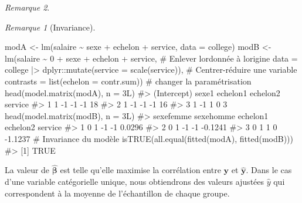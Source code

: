 \documentclass[
  11pt,
  letterpaper,
]{scrbook}
\newenvironment{Shaded}{\begin{snugshade}}{\end{snugshade}}
\newcommand{\AttributeTok}[1]{\textcolor[rgb]{0.40,0.45,0.13}{#1}}
\newcommand{\CommentTok}[1]{\textcolor[rgb]{0.37,0.37,0.37}{#1}}
\newcommand{\DecValTok}[1]{\textcolor[rgb]{0.68,0.00,0.00}{#1}}
\newcommand{\FunctionTok}[1]{\textcolor[rgb]{0.28,0.35,0.67}{#1}}
\newcommand{\NormalTok}[1]{\textcolor[rgb]{0.00,0.23,0.31}{#1}}
\newcommand{\OtherTok}[1]{\textcolor[rgb]{0.00,0.23,0.31}{#1}}
\newcommand{\SpecialCharTok}[1]{\textcolor[rgb]{0.37,0.37,0.37}{#1}}
\theoremstyle{plain}
\theoremstyle{plain}
\theoremstyle{definition}
\theoremstyle{definition}
\theoremstyle{remark}
\newtheorem{refremark}{Remarque}[chapter]
\begin{document}
\begin{refremark}
\begin{refremark}[Invariance]
\begin{Shaded}
\begin{Highlighting}[]
\NormalTok{modA }\OtherTok{\textless{}{-}} \FunctionTok{lm}\NormalTok{(salaire }\SpecialCharTok{\textasciitilde{}}\NormalTok{ sexe }\SpecialCharTok{+}\NormalTok{ echelon }\SpecialCharTok{+}\NormalTok{ service, }\AttributeTok{data =}\NormalTok{ college)}
\NormalTok{modB }\OtherTok{\textless{}{-}} \FunctionTok{lm}\NormalTok{(salaire }\SpecialCharTok{\textasciitilde{}} \DecValTok{0} \SpecialCharTok{+}\NormalTok{ sexe }\SpecialCharTok{+}\NormalTok{ echelon }\SpecialCharTok{+}\NormalTok{ service, }\CommentTok{\# Enlever l\textquotesingle{}ordonnée à l\textquotesingle{}origine}
           \AttributeTok{data =}\NormalTok{ college }\SpecialCharTok{|\textgreater{}} 
\NormalTok{            dplyr}\SpecialCharTok{::}\FunctionTok{mutate}\NormalTok{(}\AttributeTok{service =} \FunctionTok{scale}\NormalTok{(service)), }\CommentTok{\# Centrer{-}réduire une variable}
           \AttributeTok{contrasts =} \FunctionTok{list}\NormalTok{(}\AttributeTok{echelon =}\NormalTok{ contr.sum)) }\CommentTok{\# changer la paramétrisation}
\FunctionTok{head}\NormalTok{(}\FunctionTok{model.matrix}\NormalTok{(modA), }\AttributeTok{n =} \DecValTok{3}\NormalTok{L)}
\CommentTok{\#\textgreater{}   (Intercept) sexe1 echelon1 echelon2 service}
\CommentTok{\#\textgreater{} 1           1    {-}1       {-}1       {-}1      18}
\CommentTok{\#\textgreater{} 2           1    {-}1       {-}1       {-}1      16}
\CommentTok{\#\textgreater{} 3           1    {-}1        1        0       3}
\FunctionTok{head}\NormalTok{(}\FunctionTok{model.matrix}\NormalTok{(modB), }\AttributeTok{n =} \DecValTok{3}\NormalTok{L)}
\CommentTok{\#\textgreater{}   sexefemme sexehomme echelon1 echelon2 service}
\CommentTok{\#\textgreater{} 1         0         1       {-}1       {-}1  0.0296}
\CommentTok{\#\textgreater{} 2         0         1       {-}1       {-}1 {-}0.1241}
\CommentTok{\#\textgreater{} 3         0         1        1        0 {-}1.1237}
\CommentTok{\# Invariance du modèle}
\FunctionTok{isTRUE}\NormalTok{(}\FunctionTok{all.equal}\NormalTok{(}\FunctionTok{fitted}\NormalTok{(modA), }\FunctionTok{fitted}\NormalTok{(modB)))}
\CommentTok{\#\textgreater{} [1] TRUE}
\end{Highlighting}
\end{Shaded}

\label{rem-invariance}

\end{refremark}

La valeur de \(\widehat{\boldsymbol{\beta}}\) est telle qu'elle maximise
la corrélation entre \(\boldsymbol{y}\) et \(\widehat{\boldsymbol{y}}.\)
Dans le cas d'une variable catégorielle unique, nous obtiendrons des
valeurs ajustées \(\widehat{y}\) qui correspondent à la moyenne de
l'échantillon de chaque groupe.

\label{rem-geometry}

\end{refremark}
\end{document}
